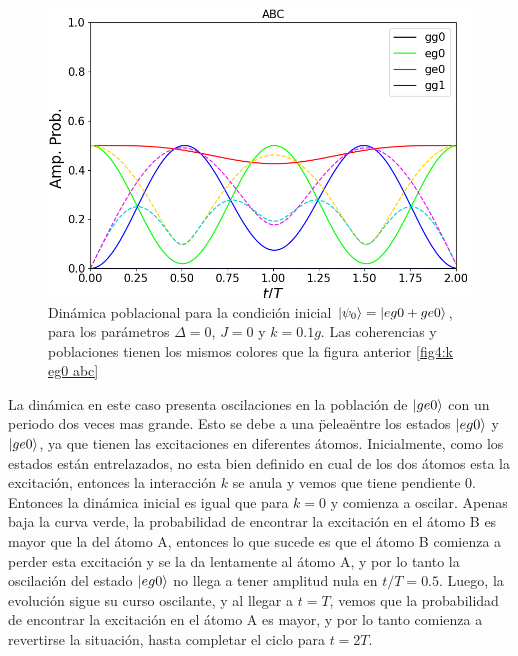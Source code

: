 \begin{figure}[h]
    \begin{minipage}[c]{0.67\textwidth}
        \includegraphics[width=\textwidth]{figuras/ch4/k eg0+ ABC.png}
    \end{minipage}\hfill
    \begin{minipage}[c]{0.3\textwidth}
    \caption{Dinámica poblacional para la condición inicial $\ket{\psi_0}=\ket{eg0+ge0}$, para los parámetros $\Delta=0$, $J=0$ y $k=0.1g$. Las coherencias y poblaciones tienen los mismos colores que la figura anterior \ref{fig4:k eg0 abc}
         } \label{fig4:k eg0 sim abc}
  \end{minipage}
\end{figure}
La dinámica en este caso presenta oscilaciones en la población de $\ket{ge0}$ con un periodo dos veces mas grande. Esto se debe a una \"pelea\" entre los estados $\ket{eg0}$ y $\ket{ge0}$, ya que tienen las excitaciones en diferentes átomos. Inicialmente, como los estados están entrelazados, no esta bien definido en cual de los dos átomos esta la excitación, entonces la interacción $k$ se anula y vemos que tiene pendiente 0. Entonces la dinámica inicial es igual que para $k=0$ y comienza a oscilar. Apenas baja la curva verde, la probabilidad de encontrar la excitación en el átomo B es mayor que la del átomo A, entonces lo que sucede es que el átomo B comienza a perder esta excitación y se la da lentamente al átomo A, y por lo tanto la oscilación del estado $\ket{eg0}$ no llega a tener amplitud nula en $t/T=0.5$. Luego, la evolución sigue su curso oscilante, y al llegar a $t=T$, vemos que la probabilidad de encontrar la excitación en el átomo A es mayor, y por lo tanto comienza a revertirse la situación, hasta completar el ciclo para $t=2T$. 

